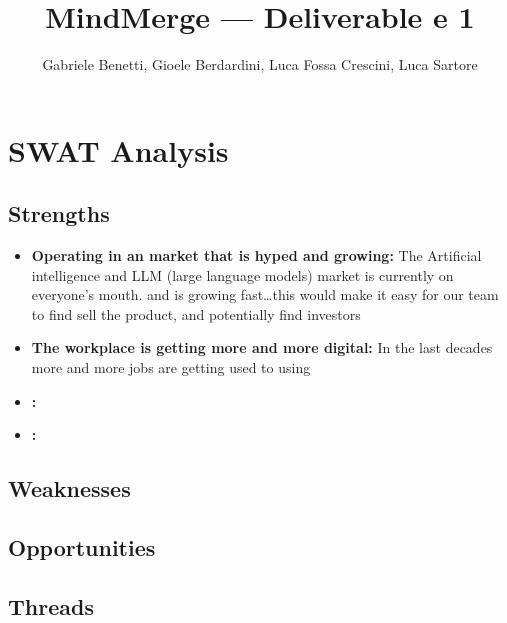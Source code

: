 \documentclass{article}
\title{MindMerge --- Deliverable e 1}
\author{Gabriele Benetti, Gioele Berdardini, Luca Fossa Crescini, Luca Sartore}
\begin{document}
\maketitle


\tableofcontents

\section{SWAT Analysis}
\subsection{Strengths}
\begin{itemize}
    \item \textbf{Operating in an market that is hyped and growing: }
          The Artificial intelligence and LLM (large language models) market is currently on everyone's mouth.
          and is growing fast\dots this would make it easy for our team to find sell the product, and potentially find investors

    \item \textbf{The workplace is getting more and more digital: }
          In the last decades more and more jobs are getting used to using

    \item \textbf{: }
    \item \textbf{: }


\end{itemize}
\subsection{Weaknesses}

\subsection{Opportunities}

\subsection{Threads}
\end{document}
